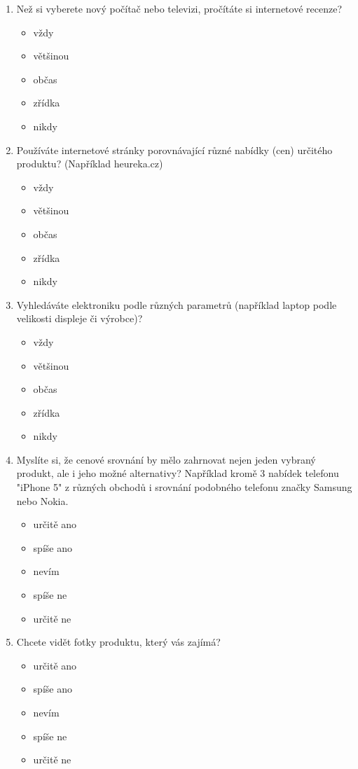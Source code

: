 \documentclass[12pt,twoside,openany]{fithesis}
\begin{document}
\begin{enumerate}
  
  \item Než si vyberete nový počítač nebo televizi, pročítáte si internetové recenze?
    \begin{itemize}
       \item vždy
       \item většinou
       \item občas
       \item zřídka
       \item nikdy
    \end{itemize}

\item Používáte internetové stránky porovnávající různé nabídky (cen) určitého produktu? (Například heureka.cz) 
    \begin{itemize}
       \item vždy
       \item většinou
       \item občas
       \item zřídka
       \item nikdy
    \end{itemize}

\item Vyhledáváte elektroniku podle různých parametrů (například laptop podle velikosti displeje či výrobce)? 
    \begin{itemize}
       \item vždy
       \item většinou
       \item občas
       \item zřídka
       \item nikdy
    \end{itemize}

  \item Myslíte si, že cenové srovnání by mělo zahrnovat nejen jeden vybraný produkt, ale i jeho možné alternativy? 
      Například kromě 3 nabídek telefonu "iPhone 5" z různých obchodů i srovnání podobného telefonu značky Samsung nebo Nokia.
    \begin{itemize}
       \item určitě ano
       \item spíše ano
       \item nevím
       \item spíše ne
       \item určitě ne
    \end{itemize}

  \item Chcete vidět fotky produktu, který vás zajímá?
    \begin{itemize}
       \item určitě ano
       \item spíše ano
       \item nevím
       \item spíše ne
       \item určitě ne
    \end{itemize}


\end{enumerate}
\end{document}
